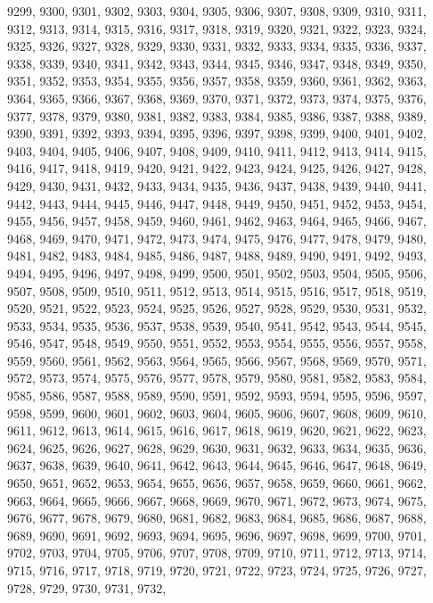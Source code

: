 9299,
9300,
9301,
9302,
9303,
9304,
9305,
9306,
9307,
9308,
9309,
9310,
9311,
9312,
9313,
9314,
9315,
9316,
9317,
9318,
9319,
9320,
9321,
9322,
9323,
9324,
9325,
9326,
9327,
9328,
9329,
9330,
9331,
9332,
9333,
9334,
9335,
9336,
9337,
9338,
9339,
9340,
9341,
9342,
9343,
9344,
9345,
9346,
9347,
9348,
9349,
9350,
9351,
9352,
9353,
9354,
9355,
9356,
9357,
9358,
9359,
9360,
9361,
9362,
9363,
9364,
9365,
9366,
9367,
9368,
9369,
9370,
9371,
9372,
9373,
9374,
9375,
9376,
9377,
9378,
9379,
9380,
9381,
9382,
9383,
9384,
9385,
9386,
9387,
9388,
9389,
9390,
9391,
9392,
9393,
9394,
9395,
9396,
9397,
9398,
9399,
9400,
9401,
9402,
9403,
9404,
9405,
9406,
9407,
9408,
9409,
9410,
9411,
9412,
9413,
9414,
9415,
9416,
9417,
9418,
9419,
9420,
9421,
9422,
9423,
9424,
9425,
9426,
9427,
9428,
9429,
9430,
9431,
9432,
9433,
9434,
9435,
9436,
9437,
9438,
9439,
9440,
9441,
9442,
9443,
9444,
9445,
9446,
9447,
9448,
9449,
9450,
9451,
9452,
9453,
9454,
9455,
9456,
9457,
9458,
9459,
9460,
9461,
9462,
9463,
9464,
9465,
9466,
9467,
9468,
9469,
9470,
9471,
9472,
9473,
9474,
9475,
9476,
9477,
9478,
9479,
9480,
9481,
9482,
9483,
9484,
9485,
9486,
9487,
9488,
9489,
9490,
9491,
9492,
9493,
9494,
9495,
9496,
9497,
9498,
9499,
9500,
9501,
9502,
9503,
9504,
9505,
9506,
9507,
9508,
9509,
9510,
9511,
9512,
9513,
9514,
9515,
9516,
9517,
9518,
9519,
9520,
9521,
9522,
9523,
9524,
9525,
9526,
9527,
9528,
9529,
9530,
9531,
9532,
9533,
9534,
9535,
9536,
9537,
9538,
9539,
9540,
9541,
9542,
9543,
9544,
9545,
9546,
9547,
9548,
9549,
9550,
9551,
9552,
9553,
9554,
9555,
9556,
9557,
9558,
9559,
9560,
9561,
9562,
9563,
9564,
9565,
9566,
9567,
9568,
9569,
9570,
9571,
9572,
9573,
9574,
9575,
9576,
9577,
9578,
9579,
9580,
9581,
9582,
9583,
9584,
9585,
9586,
9587,
9588,
9589,
9590,
9591,
9592,
9593,
9594,
9595,
9596,
9597,
9598,
9599,
9600,
9601,
9602,
9603,
9604,
9605,
9606,
9607,
9608,
9609,
9610,
9611,
9612,
9613,
9614,
9615,
9616,
9617,
9618,
9619,
9620,
9621,
9622,
9623,
9624,
9625,
9626,
9627,
9628,
9629,
9630,
9631,
9632,
9633,
9634,
9635,
9636,
9637,
9638,
9639,
9640,
9641,
9642,
9643,
9644,
9645,
9646,
9647,
9648,
9649,
9650,
9651,
9652,
9653,
9654,
9655,
9656,
9657,
9658,
9659,
9660,
9661,
9662,
9663,
9664,
9665,
9666,
9667,
9668,
9669,
9670,
9671,
9672,
9673,
9674,
9675,
9676,
9677,
9678,
9679,
9680,
9681,
9682,
9683,
9684,
9685,
9686,
9687,
9688,
9689,
9690,
9691,
9692,
9693,
9694,
9695,
9696,
9697,
9698,
9699,
9700,
9701,
9702,
9703,
9704,
9705,
9706,
9707,
9708,
9709,
9710,
9711,
9712,
9713,
9714,
9715,
9716,
9717,
9718,
9719,
9720,
9721,
9722,
9723,
9724,
9725,
9726,
9727,
9728,
9729,
9730,
9731,
9732,
